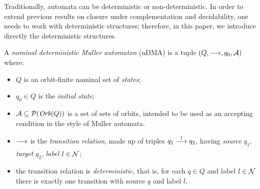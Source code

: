 
Traditionally, automata can be deterministic or non-deterministic. In order to extend previous results on closure under complementation and decidability, one needs to work with deterministic structures; therefore, in this paper, we introduce directly the deterministic structures.

\begin{definition}
 A \emph{nominal deterministic Muller automaton} (nDMA) is a tuple $(Q,\overset{}{\longrightarrow},q_0,\mathcal{A})$ where:
 
  \begin{itemize}
  \item $Q$ is an orbit-finite nominal set of \emph{states};
  
  \item $q_0 \in Q$ is the \emph{initial state};
  
  \item $\mathcal{A} \subseteq \mathcal{P}(\mathit{Orb}(Q))$ is a set of sets of orbits, intended to be used as an accepting condition in the style of Muller automata.
  
  \item $\overset{}{\underset{}{\longrightarrow}}$ is the \emph{transition relation}, made up of triples $q_1 \overset{l}{\longrightarrow} q_2$, having \emph{source} $q_1$, \emph{target} $q_2$, \emph{label} $l \in \mathcal{N}$;
  
  \item the transition relation is \emph{deterministic}, that is, for each $q \in Q$ and label $l \in \mathcal{N}$ there is exactly one transition with source $q$ and label $l$.
 \end{itemize}
\end{definition}

